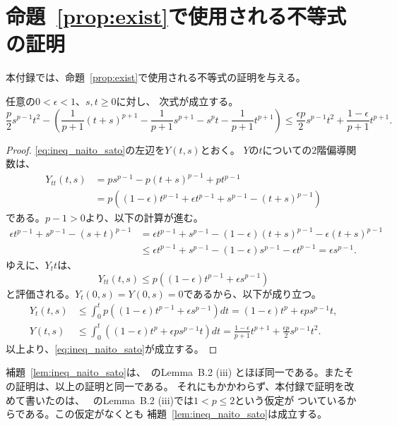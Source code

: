 
\section{命題~\ref{prop:exist}で使用される不等式の証明}

本付録では、命題~\ref{prop:exist}で使用される不等式の証明を与える。

\begin{lem} \label{lem:ineq_naito_sato}
 任意の$0 < \epsilon < 1$、$s, t \geq 0$に対し、
 次式が成立する。
 \begin{equation}
  \frac{p}{2}s^{p-1}t^2 - 
   \left( \frac{1}{p+1}(t+s)^{p+1} -
    \frac{1}{p+1}s^{p+1} - s^pt - \frac{1}{p+1}t^{p+1}
   \right) \leq \frac{\epsilon p}{2} s^{p-1}
   t^2 + \frac{1-\epsilon}{p+1} t^{p+1}. \label{eq:ineq_naito_sato}
 \end{equation}
\end{lem}
 
\begin{proof}
 \eqref{eq:ineq_naito_sato}の左辺を$Y(t, s)$とおく。
 $Y$の$t$についての$2$階偏導関数は、
 \begin{align*}
  Y_{tt}(t, s) &= p s^{p-1} - p(t+s)^{p-1} + pt^{p-1} \\
  &= p \left( (1- \epsilon) t^{p-1} + \epsilon t^{p-1} + s^{p-1} -
  (t+s)^{p-1} \right)
 \end{align*}
 である。$p - 1 > 0$より、以下の計算が進む。
 \begin{align*}
  \epsilon t^{p-1} + s^{p-1} - (s+t)^{p-1} &= 
  \epsilon t^{p-1} + s^{p-1} - (1-\epsilon)(t+s)^{p-1} - \epsilon
  (t+s)^{p-1} \\
  & \leq \epsilon t^{p-1} + s^{p-1} - (1-\epsilon) s^{p-1} - \epsilon
  t^{p-1} = \epsilon s^{p-1}.
 \end{align*}
 ゆえに、$Y_tt$は、
 \[
  Y_{tt}(t, s) \leq p \left( (1-\epsilon) t^{p-1} + \epsilon s^{p-1} \right)
 \]
 と評価される。$Y_t(0, s) = Y(0, s) = 0$であるから、以下が成り立つ。
 \begin{align*}
  Y_t(t, s) &\leq \int_0^t  p \left( (1-\epsilon) t^{p-1} + \epsilon
  s^{p-1} \right) dt = (1 - \epsilon) t^p + \epsilon p s^{p-1} t, \\
  Y(t, s) &\leq \int_0^t \left( (1 - \epsilon) t^p + \epsilon p
  s^{p-1} t \right)dt = \frac{1 -\epsilon}{p+1} t^{p+1} +
  \frac{\epsilon p}{2}s^{p-1}t^2.
 \end{align*}
 以上より、\eqref{eq:ineq_naito_sato}が成立する。\qedhere
\end{proof}

補題~\ref{lem:ineq_naito_sato}は、\cite{MR2886160}~のLemma~B.2 (iii)
とほぼ同一である。またその証明は、以上の証明と同一である。
それにもかかわらず、本付録で証明を改めて書いたのは、
\cite{MR2886160}~のLemma~B.2 (iii)では$1 < p \leq 2$という仮定が
ついているからである。この仮定がなくとも
補題~\ref{lem:ineq_naito_sato}は成立する。

